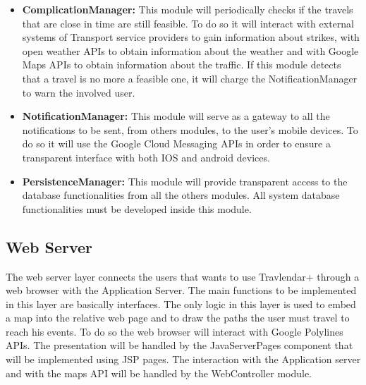 \begin{itemize}
	\item \textbf{ComplicationManager:} This module will periodically checks if the travels that are close in time are still feasible. To do so it will interact with external systems of Transport service providers to gain information about strikes, with open weather APIs to obtain information about the weather and with Google Maps APIs to obtain information about the traffic. If this module detects that a travel is no more a feasible one, it will charge the NotificationManager to warn the involved user.
	\item \textbf{NotificationManager:} This module will serve as a gateway to all the notifications to be sent, from others modules, to the user's mobile devices. To do so it will use the Google Cloud Messaging APIs in order to ensure a transparent interface with both IOS and android devices.
	\item \textbf{PersistenceManager:} This module will provide transparent access to the database functionalities from all the others modules. All system database functionalities must be developed inside this module.
\end{itemize}
\subsection{Web Server}
\label{subsect:Web Server}
	The web server layer connects the users that wants to use Travlendar+ through a web browser with the Application Server. \newline
	The main functions to be implemented in this layer are basically interfaces.
	The only logic in this layer is used to embed a map into the relative web page and to draw the paths the user must travel to reach his events. To do so the web browser will interact with Google Polylines APIs.\newline
	The presentation will be handled by the JavaServerPages component that will be implemented using JSP pages. The interaction with the Application server and with the maps API will be handled by the WebController module.

